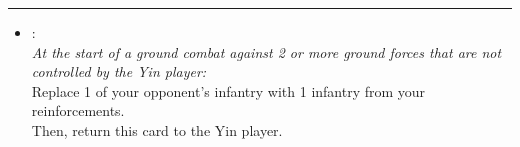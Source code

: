 \begin{multicols}{2}
\vspace{-10pt}\rule{\hsize}{0.4pt}\vspace{5pt}


\begin{itemize}
\item {}:\\
\emph{At the start of a ground combat against 2 or more ground forces that are not controlled by the Yin player:}\\
Replace 1 of your opponent's infantry with 1 infantry from your reinforcements.\\
Then, return this card to the Yin player.
\end{itemize}

\end{multicols}




